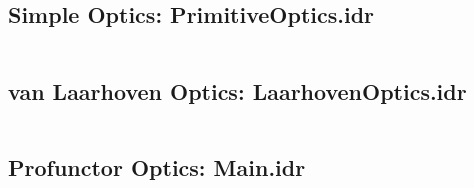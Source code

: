 \documentclass[11pt]{report}
\begin{document}
\inputminted[breaklines,linenos]{idris}{../src/Category/VProfunctor.idr}

\subsection{Simple Optics: PrimitiveOptics.idr}

\inputminted[breaklines,linenos]{idris}{../src/Primitive/PrimitiveOptics.idr}

\subsection{van Laarhoven Optics: LaarhovenOptics.idr}

\inputminted[breaklines,linenos]{idris}{../src/Primitive/LaarhovenOptics.idr}

\subsection{Profunctor Optics: Main.idr}

\inputminted[breaklines,linenos]{idris}{../src/Main.idr}
\end{document}
